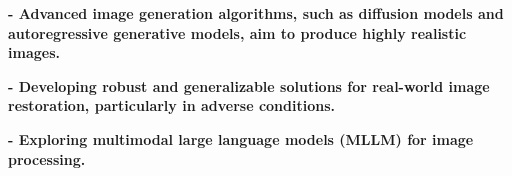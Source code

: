 \documentclass[a4paper,20pt]{article}
\makeatletter
\newcommand{\resumeItem}[2]{
  \item\small{
    \textbf{#1}{: #2 \vspace{-2pt}}
  }
}
\newcommand{\resumeSubheading}[4]{
  \vspace{-1pt}\item
    \begin{tabular*}{0.97\textwidth}{l@{\extracolsep{\fill}}r}
      \textbf{#1} & #2 \\
      \textit{#3} & \textit{#4} \\
    \end{tabular*}\vspace{-5pt}
}
\newcommand{\resumeSubHeadingListStart}{\begin{itemize}[leftmargin=*]}
\newcommand{\resumeSubHeadingListEnd}{\end{itemize}}
\newcommand{\resumeItemListStart}{\begin{itemize}}
\newcommand{\resumeItemListEnd}{\end{itemize}\vspace{-5pt}}
\makeatother
\begin{document}
\textbf{- Advanced image generation algorithms, such as diffusion models and autoregressive generative models, aim to produce highly realistic images.}
 \vspace{0.5em}
 
\textbf{- Developing robust and generalizable solutions for real-world image restoration, particularly in adverse conditions.}
 \vspace{0.5em}
 
\textbf{- Exploring multimodal large language models (MLLM) for image processing.}





\end{document}
